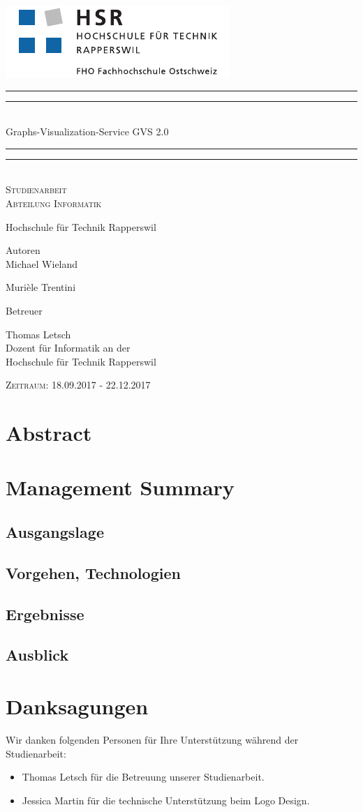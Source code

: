 \documentclass[11pt,a4paper,english,oneside]{book}
\newcommand*{\plogo}{\includegraphics{logo_hsr.pdf}}
\numberwithin{equation}{chapter}
\newcommand*{\titleGP}{\begingroup %
	\centering %
	\vspace*{\baselineskip} %
	\plogo\\[2\baselineskip] %
	\rule{\textwidth}{1.6pt}\vspace*{-\baselineskip}\vspace*{2pt} %
	\rule{\textwidth}{0.4pt}\\[\baselineskip] %
	{\LARGE Graphs-Visualization-Service GVS 2.0 }\\[0.2\baselineskip] %
	\rule{\textwidth}{0.4pt}\vspace*{-\baselineskip}\vspace{3.2pt} %
	\rule{\textwidth}{1.6pt}\\[2\baselineskip] %
	\scshape %
	\large Studienarbeit \\[2\baselineskip]
	Abteilung Informatik \par
	Hochschule für Technik Rapperswil
	\vspace*{2\baselineskip}
	
	
	Autoren\\
	{\Large  Michael Wieland  \\ [5pt]}
	
	{\Large Murièle Trentini \\ [5pt]}
	
	\vspace*{2\baselineskip}
	Betreuer\\
	{\Large Thomas Letsch  \\[5pt]
		\small Dozent für Informatik an der \\[5pt]Hochschule für Technik Rapperswil\par}
	\vspace*{2\baselineskip}
	
	\vfill
	{\scshape Zeitraum: 18.09.2017 - 22.12.2017} \\[0.3\baselineskip]
	\endgroup}
\begin{document}
	\thispagestyle{empty}
	\titleGP
	\newpage
	\doublespacing
	\setcounter{page}{1}
	\section*{Abstract}
	\thispagestyle{firststyle}
	
	
	\newpage
	
	\section*{Management Summary}
	\thispagestyle{firststyle}
	
	\subsection*{Ausgangslage}
	
	\subsection*{Vorgehen, Technologien}
	
	\subsection*{Ergebnisse}
	
	\subsection*{Ausblick}
	
	\newpage
	
	\section*{Danksagungen}
	\thispagestyle{firststyle}
	
	Wir danken folgenden Personen für Ihre Unterstützung während der Studienarbeit:
	
	\begin{itemize}
		\item Thomas Letsch für die Betreuung unserer Studienarbeit.
		\item Jessica Martin für die technische Unterstützung beim Logo Design.
	\end{itemize}

	{
		\hypersetup{linkcolor=black}
		\tableofcontents
	}

	
\end{document}
